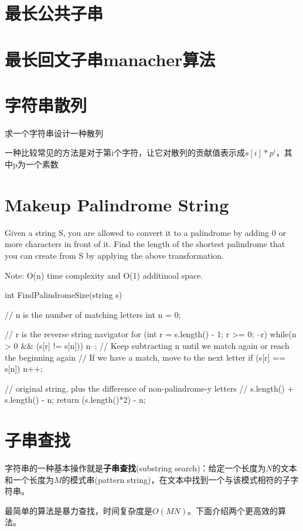 \section{最长公共子串}
\section{最长回文子串manacher算法}
\section{字符串散列}
求一个字符串设计一种散列

一种比较常见的方法是对于第i个字符，让它对散列的贡献值表示成$s[i]*p^i$，其中p为一个素数


\section{Makeup Palindrome String}
Given a string S, you are allowed to convert it to a palindrome by adding 0 or 
more characters in front of it. 
Find the length of the shortest palindrome that you can create from S by 
applying the above transformation. 

Note: O(n) time complexity and O(1) additinoal space.

\begin{Code}
	int FindPalindromeSize(string s){
		// n is the number of matching letters
		int n = 0;
		
		// r is the reverse string navigator
		for (int r = s.length() - 1; r >= 0; --r)
		{
			while(n > 0 && (s[r] != s[n]))
			{
				n--; // Keep subtracting n until we match again or reach the 
				beginning again
			}
			// If we have a match, move to the next letter
			if (s[r] == s[n]) { n++; }
		}
		
		// original string, plus the difference of non-palindrome-y letters
		// s.length() + s.length() - n;
		return (s.length()*2) - n;
	}
\end{Code}

\section{子串查找} %
\label{sec:substring-search}

字符串的一种基本操作就是\textbf{子串查找}(substring search)：给定一个长度为$N$的文本和一个长度为$M$的模式串(pattern string)，在文本中找到一个与该模式相符的子字符串。

最简单的算法是暴力查找，时间复杂度是$O(MN)$。下面介绍两个更高效的算法。


